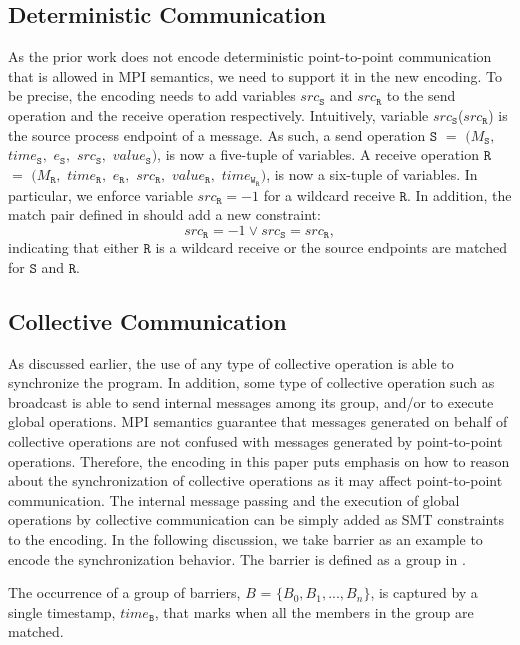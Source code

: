 \subsection{Deterministic Communication}
As the prior work \cite{DBLP:conf/kbse/HuangMM13} does not encode deterministic point-to-point communication that is allowed in MPI semantics, we need to support it in the new encoding. To be precise, the encoding needs to add variables  $src_\mathtt{S}$ and $src_\mathtt{R}$ to the send operation and the receive operation respectively. Intuitively, variable $src_\mathtt{S}$($src_\mathtt{R}$) is the source process endpoint of a message. As such, a send operation $\mathtt{S}$ $=$ $(M_\mathtt{S},$ $\mathit{time}_\mathtt{S},$ $e_\mathtt{S},$ $src_\mathtt{S},$ $\mathit{value}_\mathtt{S})$,  is now a five-tuple of variables. A receive operation $\mathtt{R}$ $=$ $(M_\mathtt{R},$ $\mathit{time}_\mathtt{R},$ $e_\mathtt{R},$ $src_\mathtt{R},$ $\mathit{value}_\mathtt{R},$ $\mathit{time}_{\mathtt{W}_\mathtt{R}})$, is now a six-tuple of variables. In particular, we enforce variable $src_\mathtt{R} = -1$ for a wildcard receive $\mathtt{R}$. In addition, the match pair defined in  should add a new constraint: 
\[
src_\mathtt{R} = -1 \vee src_\mathtt{S} = src_\mathtt{R}, 
\]
indicating that either $\mathtt{R}$ is a wildcard receive or the source endpoints are matched for $\mathtt{S}$ and $\mathtt{R}$.

\subsection{Collective Communication}
As discussed earlier, the use of any type of collective operation is able to synchronize the program. In addition, some type of collective operation such as broadcast is able to send internal messages among its group, and/or to execute global operations. MPI semantics guarantee that messages generated on behalf of collective operations are not confused with messages generated by point-to-point operations. Therefore, the encoding in this paper puts emphasis on how to reason about the synchronization of collective operations as it may affect point-to-point communication. The internal message passing and the execution of global operations by collective communication can be simply added as SMT constraints to the encoding. In the following discussion, we take barrier as an example to encode the synchronization behavior. The barrier is defined as a group in . 

\begin{definition}[Barrier]\label{def:barrier}
The occurrence of a group of barriers, $B$ = $\{B_0, B_1, ..., B_n\}$, is captured by a
single timestamp, $\mathit{time}_\mathtt{B}$, that marks when all the members in the group are matched.  
\end{definition}

